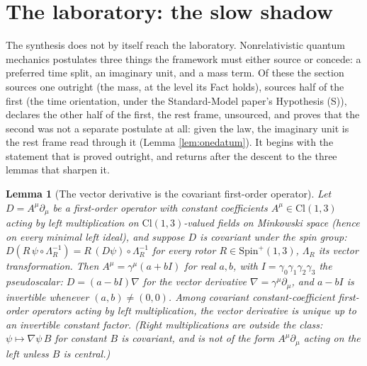 \documentclass[11pt]{article}
\newtheorem{lemma}[theorem]{Lemma}
\theoremstyle{definition}
\newcommand{\Cl}{\mathrm{Cl}}
\begin{document}
\section{The laboratory: the slow shadow}\label{sec:lab}

The synthesis does not by itself reach the laboratory. Nonrelativistic quantum mechanics postulates three things the framework must either source or concede: a preferred time split, an imaginary unit, and a mass term. Of these the section sources one outright (the mass, at the level its Fact holds), sources half of the first (the time orientation, under the Standard-Model paper's Hypothesis (S)), declares the other half of the first, the rest frame, unsourced, and proves that the second was not a separate postulate at all: given the law, the imaginary unit is the rest frame read through it (Lemma \ref{lem:onedatum}). It begins with the statement that is proved outright, and returns after the descent to the three lemmas that sharpen it.

\begin{lemma}[The vector derivative is the covariant first-order operator]\label{lem:vectorderivative}
Let $D = A^{\mu}\partial_{\mu}$ be a first-order operator with constant coefficients $A^{\mu} \in \Cl(1,3)$ acting by left multiplication on $\Cl(1,3)$-valued fields on Minkowski space (hence on every minimal left ideal), and suppose $D$ is covariant under the spin group: $D(R\,\psi\circ\Lambda_{R}^{-1}) = R\,(D\psi)\circ\Lambda_{R}^{-1}$ for every rotor $R \in \mathrm{Spin}^{+}(1,3)$, $\Lambda_{R}$ its vector transformation. Then $A^{\mu} = \gamma^{\mu}(a + bI)$ for real $a, b$, with $I = \gamma_{0}\gamma_{1}\gamma_{2}\gamma_{3}$ the pseudoscalar: $D = (a - bI)\nabla$ for the vector derivative $\nabla = \gamma^{\mu}\partial_{\mu}$, and $a - bI$ is invertible whenever $(a,b) \neq (0,0)$. Among covariant constant-coefficient first-order operators acting by left multiplication, the vector derivative is unique up to an invertible constant factor. (Right multiplications are outside the class: $\psi \mapsto \nabla\psi\,B$ for constant $B$ is covariant, and is not of the form $A^{\mu}\partial_{\mu}$ acting on the left unless $B$ is central.)
\end{lemma}
\end{document}
